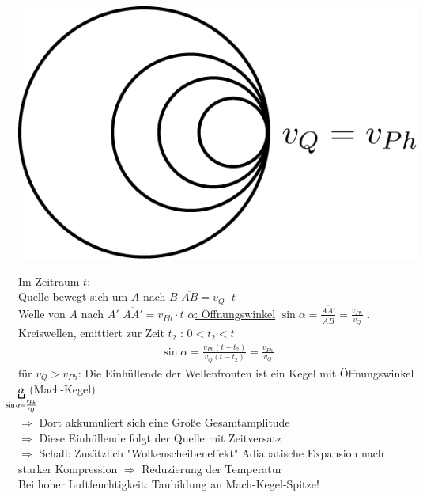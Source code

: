 \begin{center}
	\includegraphics[width=0.4\linewidth]{skizzen/19/19B31}
\end{center}
\bild
Im Zeitraum $ t $:\\
Quelle bewegt sich um $ A $ nach $ B $ \hspace{1cm} $\overline{AB} = v_Q \cdot t$\\
Welle von $ A $ nach $ A' $ \hspace{1cm} $ \overline{AA'} = v_{Ph} \cdot t $
\enter
\underline{$ \alpha $: Öffnungswinkel} $ \sin\alpha = \frac{\overline{AA'}}{\overline{AB}} = \frac{v_{Ph}}{v_Q}$
. Kreiswellen, emittiert zur Zeit $ t_2 $ : $ 0<t_2<t $
\begin{align*}
\sin\alpha = \frac{v_{Ph} (t-t_2)}{v_Q(t-t_2)} = \frac{v_{Ph}}{v_Q}
\end{align*}
für $ v_Q>v_{Ph} $: Die Einhüllende der Wellenfronten ist ein Kegel mit Öffnungswinkel $ \underbracket{\alpha}_{\mathclap{\sin\alpha=\frac{v_{Ph}}{v_Q}}} $ (Mach-Kegel)\\
$ \Rightarrow $ Dort akkumuliert sich eine Große Gesamtamplitude \\
$ \Rightarrow $ Diese Einhüllende folgt der Quelle mit Zeitversatz\\
\enter
$ \Rightarrow $ Schall:
\bild
Zusätzlich "Wolkenscheibeneffekt"
Adiabatische Expansion nach starker Kompression $ \Rightarrow $ Reduzierung der Temperatur\\
Bei hoher Luftfeuchtigkeit: Taubildung an Mach-Kegel-Spitze!
\bild